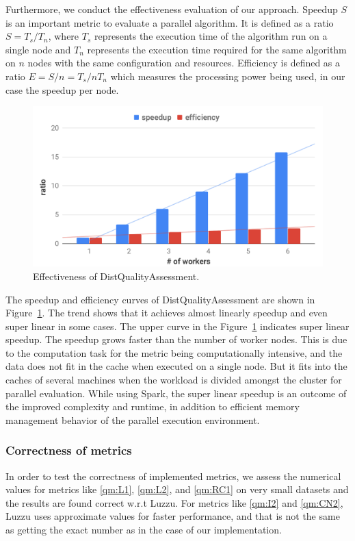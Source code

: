Furthermore, we conduct the effectiveness evaluation of our approach.
Speedup $S$ is an important metric to evaluate a parallel algorithm.
It is defined as a ratio $S=T_s/T_n$, where $T_s$ represents the execution time of the algorithm run on a single node and $T_n$ represents the execution time required for the same algorithm on $n$ nodes with the same configuration and resources.
Efficiency is defined as a ratio $E = S/n =T_s/n T_n$ which measures the processing power being used, in our case the speedup per node.

\begin{figure}
\includegraphics[width=1.0\columnwidth]{images/5_distqualityassessment/distqualityassessment-effectiveness.pdf}
\caption{Effectiveness of DistQualityAssessment.}
\label{fig:distqualityassessment-effectiveness}
\end{figure}

The speedup and efficiency curves of DistQualityAssessment are shown in Figure~\ref{fig:distqualityassessment-effectiveness}.
The trend shows that it achieves almost linearly speedup and even super linear in some cases.
The upper curve in the Figure~\ref{fig:distqualityassessment-effectiveness} indicates super linear speedup. 
The speedup grows faster than the number of worker nodes.
This is due to the computation task for the metric being computationally intensive, and the data does not fit in the cache when executed on a single node. 
But it fits into the caches of several machines when the workload is divided amongst the cluster for parallel evaluation.
While using Spark, the super linear speedup is an outcome of the improved complexity and runtime, in addition to efficient memory management behavior of the parallel execution environment.

\subsubsection{Correctness of metrics}
In order to test the correctness of implemented metrics, we assess the numerical values for metrics like \ref{qm:L1}, \ref{qm:L2}, and \ref{qm:RC1} on very small datasets and the results are found correct w.r.t Luzzu. 
For metrics like \ref{qm:I2} and \ref{qm:CN2}, Luzzu uses approximate values for faster performance, and that is not the same as getting the exact number as in the case of our implementation.

